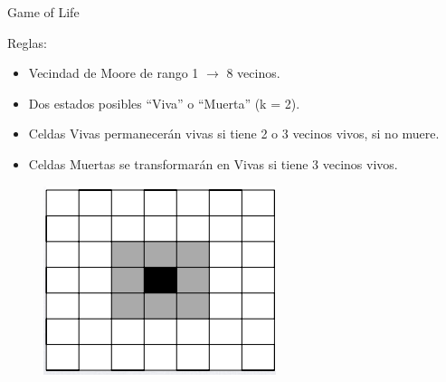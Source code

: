 \begin{frame}{Game of Life}
    \begin{block}{Reglas:}
        \begin{itemize}
            \item Vecindad de Moore de rango 1 $\longrightarrow$ 8 vecinos.
            \item Dos estados posibles “Viva” o “Muerta” (k = 2).
            \item Celdas Vivas permanecerán vivas si tiene 2 o 3 vecinos vivos, si no muere.
            \item Celdas Muertas se transformarán en Vivas si tiene  3 vecinos vivos.
        \end{itemize}
        \begin{figure}[H]
            \centering
            \includegraphics[width=0.2\linewidth]{pic/01-intro/moore_1}
        \end{figure}
    \end{block}
\end{frame}
